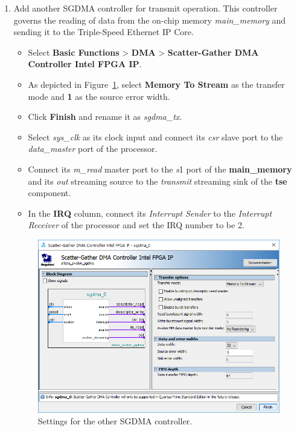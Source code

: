 \documentclass[11pt, twoside, pdftex]{article}
\begin{document}
\begin{enumerate}
	\item Add another SGDMA controller for transmit operation. This controller governs the reading of data from the on-chip memory {\it main\_memory} and sending it to the Triple-Speed Ethernet IP Core. 
		\begin{itemize}
			\item Select {\bf Basic Functions} > {\bf DMA} > {\bf Scatter-Gather DMA Controller Intel FPGA IP}. 
			\item As depicted in Figure~\ref{fig:sgdma_settings2}, select {\bf Memory To Stream} as the transfer mode and {\bf 1} as the source error width. 
			\item Click {\bf Finish} and rename it as {\it sgdma\_tx}.
			\item Select {\it sys\_clk} as its clock input and connect its {\it csr} slave port to the {\it data\_master} port of the processor.
			\item Connect its {\it m\_read} master port to the {\it s}1 port of the {\bf main\_memory} and its {\it out} streaming source to the {\it transmit} streaming sink of the {\bf tse} component. 
			\item In the {\bf IRQ} column, connect its {\it Interrupt Sender} to the {\it Interrupt Receiver} of the processor and set the IRQ number to be 2. 
		\end{itemize}

		\begin{figure}[H]
			\centering
			  \includegraphics[scale=0.65]{figures/sgdma_settings2.png}
			\caption{Settings for the other SGDMA controller.} 
			\label{fig:sgdma_settings2}
		\end{figure}
	

\end{enumerate}
\end{document}
